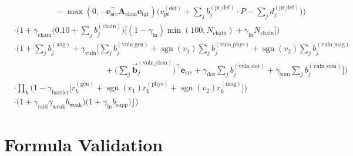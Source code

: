 \documentclass[twocolumn,10pt]{article}
\DeclareMathOperator{\sgn}{sgn}
\begin{document}
\begin{strip}
\begin{equation}
\begin{aligned}
  & \qquad\qquad\quad - \max(0, -\mathbf{e}_{\text{src}}^\top \mathbf{A}_{\text{elem}} \mathbf{e}_{\text{tgt}}) \Big( v_{\text{pr}}^{(\text{def})} + \sum_j b_j^{(\text{pr\_def})} \cdot P - \sum_j d_j^{(\text{pr\_def})} \Big) \bigg) \\
  & \cdot \bigg( 1 + \gamma_{\text{chain}} \big( 0.10 + \sum_j b_j^{(\text{chain})} \big) \Big[ (1 - \gamma_{\text{ln}})\min(100, N_{\text{chain}}) + \gamma_{\text{ln}} N_{\text{chain}} \Big] \bigg) \\
  & \cdot \bigg( 1 + \sum_j b_j^{(\text{aug})} + \gamma_{\text{vuln}} \Big[ \sum_j b_j^{(\text{vuln\_gen})} + \sgn(v_1)\sum_j b_j^{(\text{vuln\_phys})} + \sgn(v_2)\sum_j b_j^{(\text{vuln\_mag})} \\
  & \qquad\qquad\qquad\qquad\qquad\quad + \big( \sum_j \vec{\mathbf{b}}_j^{(\text{vuln\_elem})} \big)^\top \mathbf{e}_{\text{src}} + \gamma_{\text{dot}} \sum_j b_j^{(\text{vuln\_dot})} + \gamma_{\text{sum}} \sum_j b_j^{(\text{vuln\_sum})} \Big] \bigg) \\
  & \cdot \prod_k \bigg( 1 - \gamma_{\text{barrier}} \Big[ r_k^{(\text{gen})} + \sgn(v_1) r_k^{(\text{phys})} + \sgn(v_2) r_k^{(\text{mag})} \Big] \bigg) \\
  & \cdot \Big( 1 + \gamma_{\text{raid}} \gamma_{\text{weak}} b_{\text{weak}} \Big) \Big( 1 + \gamma_{\text{ln}} b_{\text{supp}} \Big)
  \Biggr\rfloor \Biggr)
\end{aligned}
\end{equation}
\end{strip}

\clearpage
\onecolumn

\section{Formula Validation}
\label{sec:validation}
\end{document}
